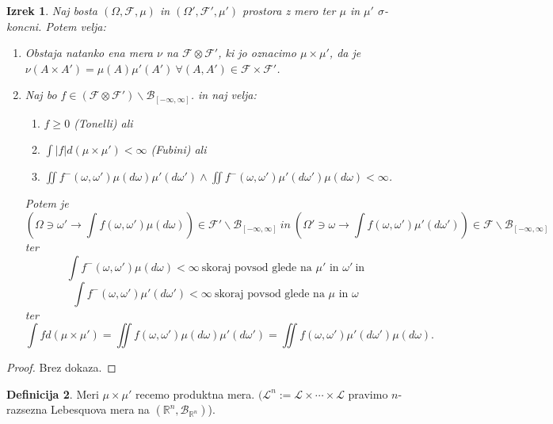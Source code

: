 \documentclass[a4paper,12pt]{article}
\theoremstyle{definition} %
\newtheorem{definicija}{Definicija}[section]
\theoremstyle{plain} %
\newtheorem{izrek}[definicija]{Izrek}
\newcommand{\R}{\mathbb{R}}
\newcommand{\F}{\mathcal{F}}
\begin{document}
            \begin{izrek}
                Naj bosta $(\Omega, \F, \mu)$ in $(\Omega', \F', \mu')$ prostora z mero ter $\mu$ in $\mu'$ $\sigma$-koncni. Potem velja:
                \begin{enumerate}
                    \item Obstaja natanko ena mera $\nu$ na $\F \otimes \F'$, ki jo oznacimo $\mu \times \mu'$, da je $\nu(A \times A') = \mu(A)\mu'(A') \ \forall (A, A') \in \F \times \F'$.
                    \item Naj bo $f \in (\F \otimes \F')\backslash\mathcal{B}_{[-\infty, \infty]}$. in naj velja:
                        \begin{enumerate}
                            \item $ f \geq 0$ (Tonelli) ali
                            \item $\int|f|d(\mu \times \mu') < \infty$ (Fubini) ali
                            \item $\iint f^-(\omega, \omega')\mu(d\omega)\mu'(d\omega') \wedge \iint f^-(\omega, \omega')\mu'(d\omega')\mu(d\omega) < \infty$.
                        \end{enumerate}
                        Potem je 
                        $$
                        (\Omega \ni \omega' \rightarrow \int f(\omega, \omega')\mu(d\omega)) \in \F'\backslash\mathcal{B}_{[-\infty, \infty]}\ in \
                        (\Omega' \ni \omega \rightarrow \int f(\omega, \omega')\mu'(d\omega')) \in \F\backslash\mathcal{B}_{[-\infty, \infty]}
                        $$
                        ter
                        $$
                        \int f^-(\omega, \omega')\mu(d\omega) < \infty \ \text{skoraj povsod glede na $\mu'$ in $\omega'$} \ \text{in}
                        $$
                        $$
                        \int f^-(\omega, \omega')\mu'(d\omega') < \infty \ \text{skoraj povsod glede na $\mu$ in $\omega$}           
                        $$
                        ter
                        $$
                         \int fd(\mu\times\mu') = \iint f(\omega, \omega')\mu(d\omega)\mu'(d\omega') = \iint f(\omega, \omega')\mu'(d\omega')\mu(d\omega).
                        $$
                \end{enumerate}
            \end{izrek}

            \begin{proof}
                Brez dokaza.
            \end{proof}

            \begin{definicija}
                Meri $\mu \times \mu'$ recemo produktna mera. $(\mathcal{L}^n:= \mathcal{L}\times \cdots \times\mathcal{L}$ 
                pravimo $n$-razsezna Lebesquova mera na $(\R^n, \mathcal{B}_{\R^n})$). 
            \end{definicija}




            
\end{document}
